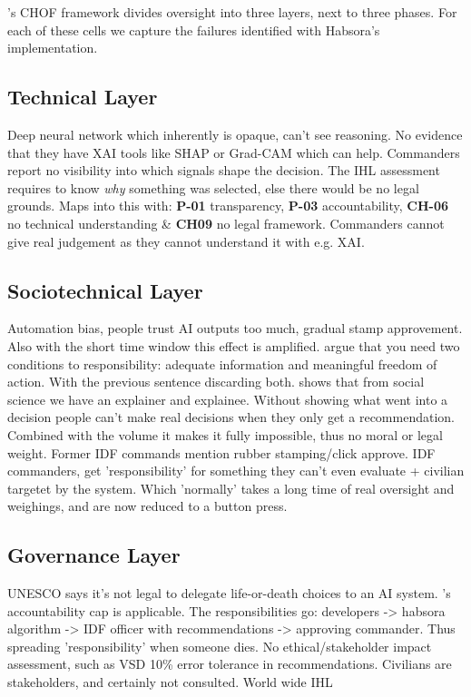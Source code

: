 \citet{info12090385}'s CHOF framework divides oversight into three layers, next to three phases. For each of these cells we capture the failures identified with Habsora's implementation.
\subsection{Technical Layer}
Deep neural network which inherently is opaque, can't see reasoning.
No evidence that they have XAI tools like SHAP or Grad-CAM which can help.
Commanders report no visibility into which signals shape the decision.
The IHL assessment requires to know \textit{why} something was selected, else there would be no legal grounds.
\citet{khan2021ethicsaisystematicliterature} Maps into this with: \textbf{P-01} transparency, \textbf{P-03} accountability, \textbf{CH-06} no technical understanding \& \textbf{CH09} no legal framework.
Commanders cannot give real judgement as they cannot understand it with e.g. XAI.

\subsection{Sociotechnical Layer}
Automation bias, people trust AI outputs too much, gradual stamp approvement. Also with the short time window this effect is amplified.
\citet{mhcof} argue that you need two conditions to responsibility: adequate information and meaningful freedom of action. With the previous sentence discarding both. 
\citet{miller2018explanationartificialintelligenceinsights} shows that from social science we have an explainer and explainee. Without showing what went into a decision people can't make real decisions when they only get a recommendation. 
Combined with the volume it makes it fully impossible, thus no moral or legal weight.
Former IDF commands mention rubber stamping/click approve.
IDF commanders, get 'responsibility' for something they can't even evaluate + civilian targetet by the system. Which 'normally' takes a long time of real oversight and weighings, and are now reduced to a button press.

\subsection{Governance Layer}
UNESCO says it's not legal to delegate life-or-death choices to an AI system. 
\citet{aimag.v40i1.2848}'s accountability cap is applicable. The responsibilities go: developers -> habsora algorithm -> IDF officer with recommendations -> approving commander. Thus spreading 'responsibility' when someone dies. 
No ethical/stakeholder impact assessment, such as VSD
10\% error tolerance in recommendations. 
Civilians are stakeholders, and certainly not consulted. 
World wide IHL